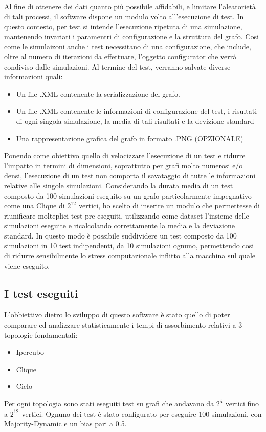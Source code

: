 \documentclass{article}
\begin{document}
Al fine di ottenere dei dati quanto più possibile affidabili, e limitare l'aleatorietà di tali processi, il software dispone un modulo volto all'esecuzione di test. In questo contesto, per test si intende l'esecuzione ripetuta di una simulazione, mantenendo invariati i paramentri di configurazione e la struttura del grafo. Cosi come le simulaizoni anche i test necessitano di una configurazione, che include, oltre al numero di iterazioni da effettuare, l'oggetto configurator che verrà condiviso dalle simulazioni.\newline
Al termine del test, verranno salvate diverse informazioni quali:
\begin{itemize}
\item Un file .XML contenente la serializzazione del grafo.
\item Un file .XML contenente le informazioni di configurazione del test, i risultati di ogni singola             simulazione, la media di tali risultati e la devizione standard
\item Una rappresentazione grafica del grafo in formato .PNG (OPZIONALE)
\end{itemize}
\newline
Ponendo come obiettivo quello di velocizzare l'esecuzione di un test e ridurre l'impatto in termini di dimensioni, soprattutto per grafi molto numerosi e/o densi, l'esecuzione di un test non comporta il savataggio di tutte le informazioni relative alle singole simulazioni.
Considerando la durata media di un test composto da 100 simulazioni eseguito su un grafo particolarmente  impegnativo come una Clique di $2^{12^{\mathrm{}}}$ vertici, ho scelto di inserire un modulo che permettesse di riunificare molteplici test pre-eseguiti, utilizzando come dataset l'insieme delle simulazioni eseguite e ricalcolando correttamente la media e la deviazione standard. \newline
In questo modo è possibile suddividere un test composto da 100 simulazioni in 10 test indipendenti, da 10 simulazioni ognuno, permettendo cosi di ridurre sensibilmente lo stress computazionale inflitto alla macchina sul quale viene eseguito.


\subsection{I test eseguiti}
 L'obbiettivo dietro lo sviluppo di questo software è stato quello di poter comparare ed analizzare statisticamente i tempi di assorbimento relativi a 3 topologie fondamentali:
 \begin{itemize}
\item Ipercubo
\item Clique
\item Ciclo
\end{itemize}
\newline
Per ogni topologia sono stati eseguiti test su grafi che andavano da $2^{5^{\mathrm{}}}$ vertici fino a $2^{12^{\mathrm{}}}$ vertici.\newline
Ognuno dei test è stato configurato per eseguire 100 simulazioni, con  Majority-Dynamic e un bias pari a 0.5. \newline
\end{document}
